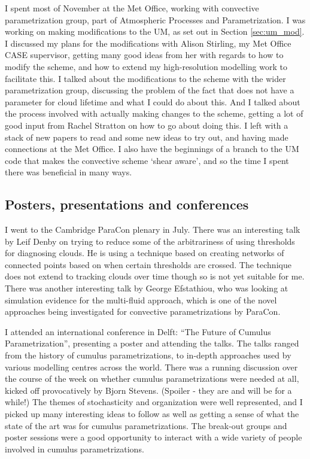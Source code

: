 \documentclass[11pt,a4paper]{article}
\begin{document}
I spent most of November at the Met Office, working with convective parametrization group, part of Atmospheric Processes and Parametrization. I was working on making modifications to the UM, as set out in Section \ref{sec:um_mod}. I discussed my plans for the modifications with Alison Stirling, my Met Office CASE supervisor, getting many good ideas from her with regards to how to modify the scheme, and how to extend my high-resolution modelling work to facilitate this. I talked about the modifications to the scheme with the wider parametrization group, discussing the problem of the fact that \cite{gregory1990mass} does not have a parameter for cloud lifetime and what I could do about this. And I talked about the process involved with actually making changes to the scheme, getting a lot of good input from Rachel Stratton on how to go about doing this. I left with a stack of new papers to read and some new ideas to try out, and having made connections at the Met Office. I also have the beginnings of a branch to the UM code that makes the convective scheme `shear aware', and so the time I spent there was beneficial in many ways.

\subsection{Posters, presentations and conferences}
\label{sec:presentations}
I went to the Cambridge ParaCon plenary in July. There was an interesting talk by Leif Denby on trying to reduce some of the arbitrariness of using thresholds for diagnosing clouds. He is using a technique based on creating networks of connected points based on when certain thresholds are crossed. The technique does not extend to tracking clouds over time though so is not yet suitable for me. There was another interesting talk by George Efstathiou, who was looking at simulation evidence for the multi-fluid approach, which is one of the novel approaches being investigated for convective parametrizations by ParaCon.

I attended an international conference in Delft: ``The Future of Cumulus Parametrization'', presenting a poster and attending the talks. The talks ranged from the history of cumulus parametrizations, to in-depth approaches used by various modelling centres across the world. There was a running discussion over the course of the week on whether cumulus parametrizations were needed at all, kicked off provocatively by Bjorn Stevens. (Spoiler - they are and will be for a while!) The themes of stochasticity and organization were well represented, and I picked up many interesting ideas to follow as well as getting a sense of what the state of the art was for cumulus parametrizations. The break-out groups and poster sessions were a good opportunity to interact with a wide variety of people involved in cumulus parametrizations.
\end{document}
